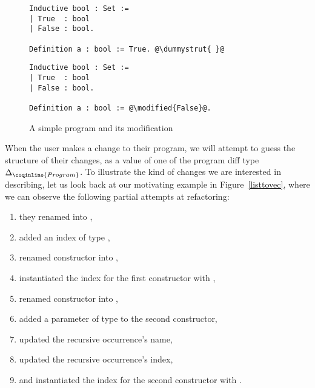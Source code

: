 \begin{figure*}[!htp]

  \noindent%
  \begin{minipage}[t]{0.50\textwidth}
    \begin{verbatim}
Inductive bool : Set :=
| True  : bool
| False : bool.

Definition a : bool := True. @\dummystrut{ }@
\end{verbatim}
\end{minipage}%
\begin{minipage}[t]{0.50\textwidth}
  \begin{verbatim}
Inductive bool : Set :=
| True  : bool
| False : bool.

Definition a : bool := @\modified{False}@.
\end{verbatim}
\end{minipage}

\caption{A simple program and its modification}

\label{bool-modification}

\end{figure*}

When the user makes a change to their program, we will attempt to guess the
structure of their changes, as a value of one of the program diff type
$\Delta_{\coqinline{Program}}$.  To illustrate the kind of changes we are
interested in describing, let us look back at our motivating example in
Figure~\ref{listtovec}, where we can observe the following partial attempts at
refactoring:

\begin{enumerate}

\item they renamed  into ,

\item added an index of type ,

\item renamed constructor  into ,

\item instantiated the index for the first constructor with ,

\item renamed constructor  into ,

\item added a parameter  of type  to the second
  constructor,

\item updated the recursive occurrence's name,

\item updated the recursive occurrence's index,

\item and instantiated the index for the second constructor with .

\end{enumerate}

